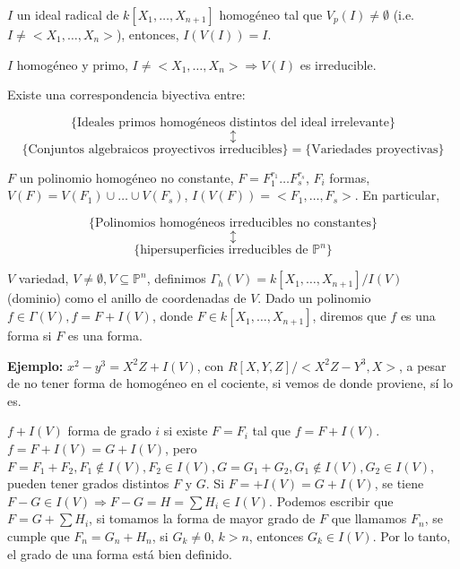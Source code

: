 \begin{Cor}
$I$ un ideal radical de $k[X_1,\dots , X_{n+1}]$ homogéneo tal que $V_p(I)\neq \emptyset$ (i.e. $I \neq <X_1,\dots ,X_n>$), entonces, $I(V(I))=I$.
\end{Cor}

\begin{Cor}
$I$ homogéneo y primo, $I\neq <X_1,\dots ,X_n> \Rightarrow V(I)$ es irreducible. 
\end{Cor}

\begin{Cor}
Existe una correspondencia biyectiva entre:

$$\{ \text{Ideales primos homogéneos distintos del ideal irrelevante} \} $$
$$\updownarrow$$
$$\{\text{Conjuntos algebraicos proyectivos irreducibles} \} = \{\text{Variedades proyectivas}\}$$
\end{Cor}

\begin{Cor}
$F$ un polinomio homogéneo no constante, $F= F_1^{r_1}\dots F_s^{r_s}$, $F_i$ formas, $V(F)=V(F_1)\cup \dots \cup V(F_s)$, $I(V(F))=<F_1,\dots , F_s>$. En particular,

$$\{\text{Polinomios homogéneos irreducibles no constantes} \} $$
$$\updownarrow $$
$$\{ \text{hipersuperficies irreducibles de } \mathbb{P}^n  \} $$

\end{Cor}

\begin{Def}
$V$ variedad, $V\neq \emptyset , V \subseteq \mathbb{P}^n$, definimos $\Gamma_h (V) = k[X_1,\dots , X_{n+1}]/I(V)$ (dominio) como el anillo de coordenadas de $V$. Dado un polinomio $f\in \Gamma(V), f = F+ I(V)$, donde $F\in k[X_1,\dots , X_{n+1}]$, diremos que $f$ es una forma si $F$ es una forma. 
\end{Def}


\textbf{Ejemplo: } $x^2-y^3 = X^2Z+I(V)$, con $R[X,Y,Z]/<X^2Z-Y^3,X>$, a pesar de no tener forma de homogéneo en el cociente, si vemos de donde proviene, sí lo es. 

\begin{nota}
$f+I(V)$ forma de grado $i$ si existe $F=F_i$ tal que $f=F+I(V)$. $f=F+I(V)=G+I(V)$, pero $F=F_1+F_2, F_1\notin I(V), F_2\in I(V), G=G_1+G_2, G_1\notin I(V), G_2\in I(V)$, pueden tener grados distintos $F$ y $G$. Si  $F=+I(V)=G+I(V)$, se tiene $F-G\in I(V) \Rightarrow F-G =H= \sum H_i \in I(V)$. Podemos escribir que $F=G+\sum H_i$, si tomamos la forma de mayor grado de $F$ que llamamos $F_n$, se cumple que $F_n=G_n+H_n$, si $G_k\neq 0$, $k>n$, entonces $G_k \in I(V)$. Por lo tanto, el grado de una forma está bien definido. 
\end{nota}

